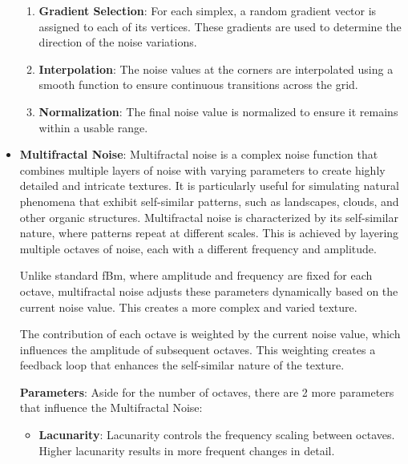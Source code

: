 \documentclass[12pt]{article}
\begin{document}
\begin{itemize}
\begin {enumerate}
        \item \textbf{Gradient Selection}:
        \newline
        For each simplex, a random gradient vector is assigned to each of its vertices. These gradients are used to determine the direction of the noise variations.

        \item \textbf{Interpolation}:
        \newline
        The noise values at the corners are interpolated using a smooth function to ensure continuous transitions across the grid.

        \item \textbf{Normalization}:
        \newline
        The final noise value is normalized to ensure it remains within a usable range.
    \end{enumerate}

    \item \textbf{Multifractal Noise}:
    \newline
    Multifractal noise is a complex noise function that combines multiple layers of noise with varying parameters to create highly detailed and intricate textures.
    It is particularly useful for simulating natural phenomena that exhibit self-similar patterns, such as landscapes, clouds, and other organic structures.
    Multifractal noise is characterized by its self-similar nature, where patterns repeat at different scales. This is achieved by layering multiple octaves of noise, each with a different frequency and amplitude.

    Unlike standard fBm, where amplitude and frequency are fixed for each octave, multifractal noise adjusts these parameters dynamically based on the current noise value. 
    This creates a more complex and varied texture.

    The contribution of each octave is weighted by the current noise value, which influences the amplitude of subsequent octaves. 
    This weighting creates a feedback loop that enhances the self-similar nature of the texture.

    \textbf{Parameters}:
    Aside for the number of octaves, there are 2 more parameters that influence the Multifractal Noise:
    \begin{itemize}
        \item \textbf{Lacunarity}:
        \newline
        Lacunarity controls the frequency scaling between octaves. Higher lacunarity results in more frequent changes in detail.


\end{itemize}
\end{itemize}
\end{document}
